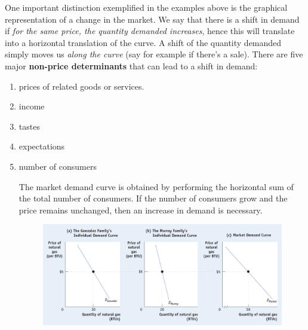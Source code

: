 \documentclass[english,course, draft]{Notes}
\newcommand{\ita}[1]{\textit{#1}}
\begin{document}
		
	\par{One important distinction exemplified in the examples above is the graphical representation of a change in the market. We say that there is a shift in demand if \ita{for the same price, the quantity demanded increases}, hence this will translate into a horizontal translation of the curve. A shift of the quantity demanded simply moves us \ita{along the curve} (say for example if there's a sale). There are five major \textbf{non-price determinants} that can lead to a shift in demand:}
	\begin{enumerate}
	\item  prices of related goods or services. 
	
	
	\item income
	
	
	
	\item tastes
	\item expectations
	
	\item number of consumers
	
	
	\par{The market demand curve is obtained by performing the horizontal sum of the total number of consumers. If the number of consumers grow and the price remains unchanged, then an increase in demand is necessary.}
		\begin{figure}[ht]
\centering
\includegraphics[width=\textwidth]{demandIndividual}
\end{figure}

	\end{enumerate}
	
\end{document}
